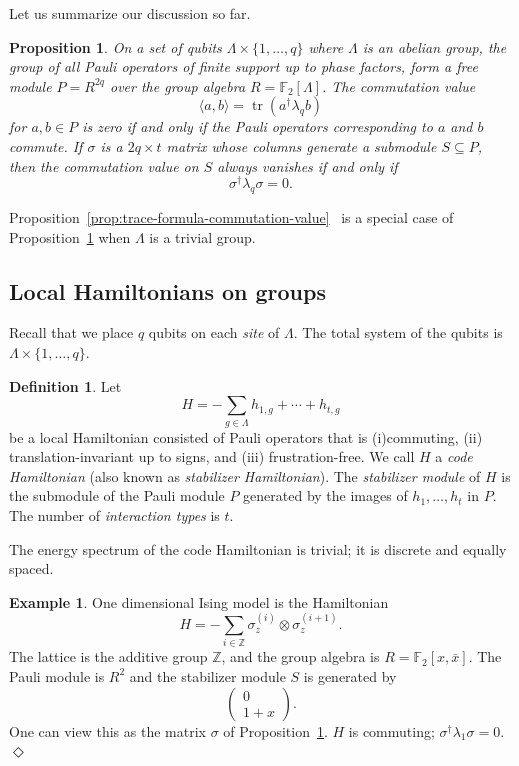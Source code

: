 \documentclass[letterpaper,12pt]{amsart}
\newtheorem{prop}[lem]{Proposition}
\theoremstyle{definition} \newtheorem{defn}{Definition}
\theoremstyle{definition} \newtheorem{rem}{Remark}
\theoremstyle{definition} \newtheorem{example}{Example}
\newcommand{\tr}{\mathop{\mathrm{tr}}}
\newcommand{\FF}{\mathbb{F}}
\begin{document}
Let us summarize our discussion so far.
\begin{prop}
On a set of qubits $\Lambda \times \{1,\ldots,q\}$ where $\Lambda$ is an abelian group,
the group of all Pauli operators of finite support up to phase factors,
form a free module $P=R^{2q}$ over the group algebra $R = \FF_2[\Lambda]$.
The commutation value
\[ 
 \langle a, b \rangle = \tr( a^\dagger \lambda_q b )
\]
for $a,b \in P$ is zero
if and only if the Pauli operators corresponding to $a$ and $b$ commute.
If $\sigma$ is a $2q \times t$ matrix whose columns generate a submodule $S \subseteq P$,
then the commutation value on $S$ always vanishes if and only if
\[
 \sigma^\dagger \lambda_q \sigma = 0 .
\]
\label{prop:pauli-module}
\end{prop}
Proposition~\ref{prop:trace-formula-commutation-value}~\cite{CalderbankRainsShorEtAl1997Quantum}
is a special case of Proposition~\ref{prop:pauli-module} when $\Lambda$ is a trivial group.

\subsection{Local Hamiltonians on groups}
Recall that we place $q$ qubits on each {\em site} of $\Lambda$.
The total system of the qubits is $\Lambda \times \{1,\ldots,q\}$.
\begin{defn}
Let
\[
 H = -\sum_{g \in \Lambda} h_{1,g} + \cdots + h_{t,g}
\]
be a local Hamiltonian consisted of Pauli operators that is (i)commuting, (ii) translation-invariant up to signs, and (iii) frustration-free.
We call $H$ a {\em code Hamiltonian} (also known as {\em stabilizer Hamiltonian}).
The {\em stabilizer module} of $H$ is the submodule of the Pauli module $P$
generated by the images of $h_1,\ldots,h_t$ in $P$.
The number of {\em interaction types} is $t$.
\end{defn}
The energy spectrum of the code Hamiltonian is trivial;
it is discrete and equally spaced.

\begin{example}
One dimensional Ising model is the Hamiltonian
\[
 H = - \sum_{i \in \mathbb{Z}} \sigma_z^{(i)} \otimes \sigma_z^{(i+1)} .
\]
The lattice is the additive group $\mathbb{Z}$,
and the group algebra is $R=\FF_2[x,\bar x]$.
The Pauli module is $R^2$ and the stabilizer module $S$ is generated by
\[
\begin{pmatrix}
 0 \\
 1+x
\end{pmatrix} .
\]
One can view this as the matrix $\sigma$ of Proposition~\ref{prop:pauli-module}.
$H$ is commuting; $\sigma^\dagger \lambda_1 \sigma = 0$.
\hfill $\Diamond$
\label{eg:1d-ising}
\end{example}
\end{document}

